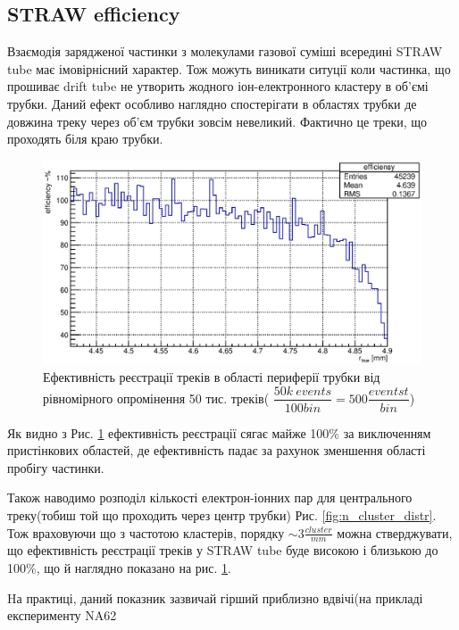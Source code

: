 \documentclass[]{article}
\begin{document}
	\subsection{ STRAW efficiency}
	Взаємодія зарядженої частинки з молекулами газової суміші всередині STRAW tube має імовірнісний характер. Тож можуть виникати ситуції коли частинка, що прошиває drift tube не утворить жодного іон-електронного кластеру в об’ємі трубки. Даний ефект особливо наглядно спостерігати в областях трубки де довжина треку через об’єм трубки зовсім невеликий. Фактично це  треки, що проходять біля краю трубки.
	
	\begin{figure}
	\includegraphics[width=\textwidth]{periffEff}
	\caption{Ефективність реєстрації треків в області периферії трубки від рівномірного опромінення 50 тис. треків( $\dfrac{50k~events}{100 bin}  = 500 \dfrac{eventst}{bin}$)}
	\label{fig:efficiency}
	\end{figure}
	
	Як видно з Рис. \ref{fig:efficiency} ефективність реєстрації сягає майже 100\% за виключенням пристінкових областей, де ефективність падає за рахунок зменшення області пробігу частинки.
	
	Також наводимо розподіл кількості електрон-іонних пар для центрального треку(тобиш той що проходить через центр трубки) Рис. \ref{fig:n_cluster_distr}. Тож враховуючи що з частотою кластерів, порядку $\sim 3 \frac{cluster}{mm}$ можна стверджувати, що ефективність реєстрації треків у STRAW tube буде високою і близькою до 100\%, що й наглядно показано на рис. \ref{fig:efficiency}.
	
	Hа практиці, даний показник зазвичай гірший приблизно вдвічі(на прикладі експерименту NA62 \cite{}
	 
\end{document}
